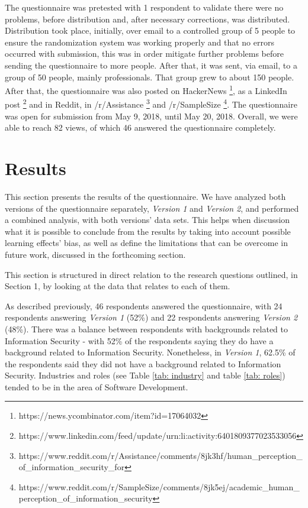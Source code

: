 The questionnaire was pretested with 1 respondent to validate there were no problems, before distribution and, after necessary corrections, was distributed. Distribution took place, initially, over email to a controlled group of 5 people to ensure the randomization system was working properly and that no errors occurred with submission, this was in order mitigate further problems before sending the questionnaire to more people. After that, it was sent, via email, to a group of 50 people, mainly professionals. That group grew to about 150 people. After that, the questionnaire was also posted on HackerNews \footnote{https://news.ycombinator.com/item?id=17064032}, as a LinkedIn post \footnote{https://www.linkedin.com/feed/update/urn:li:activity:6401809377023533056} and in Reddit, in /r/Assistance \footnote{https://www.reddit.com/r/Assistance/comments/8jk3hf/human\_perception\_of\_information\_security\_for} and /r/SampleSize  \footnote{https://www.reddit.com/r/SampleSize/comments/8jk5ej/academic\_human\_perception\_of\_information\_security}. The questionnaire was open for submission from May 9, 2018, until May 20, 2018. Overall, we were able to reach 82 views, of which 46 answered the questionnaire completely.

\section{Results}


This section presents the results of the questionnaire. We have analyzed both versions of the questionnaire separately, \textit{Version 1} and \textit{Version 2}, and performed a combined analysis, with both versions' data sets. This helps when discussion what it is possible to conclude from the results by taking into account possible learning effects' bias, as well as define the limitations that can be overcome in future work, discussed in the forthcoming section.

This section is structured in direct relation to the research questions outlined, in Section 1, by looking at the data that relates to each of them.

As described previously, 46 respondents answered the questionnaire, with 24 respondents answering \textit{Version 1} (52\%) and 22 respondents answering \textit{Version 2} (48\%). There was a balance between respondents with backgrounds related to Information Security - with 52\% of the respondents saying they do have a background related to Information Security. Nonetheless, in \textit{Version 1}, 62.5\% of the respondents said they did not have a background related to Information Security. Industries and roles (see Table \ref{tab: industry} and table \ref{tab: roles}) tended to be in the area of Software Development.

